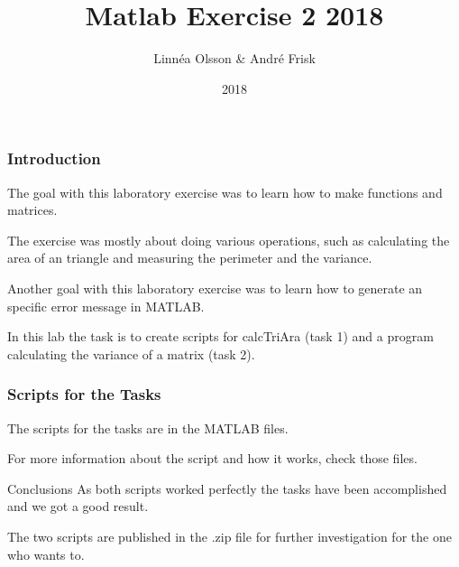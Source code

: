 \documentclass{beamer}
\title{Matlab Exercise 2 2018}
\author{Linnéa Olsson & André Frisk}
\institute{Halmstad University}
\date{2018}
\begin{document}
 
\frame{\titlepage}
 
\begin{frame}
\frametitle{Introduction}
The goal with this laboratory exercise was to learn how to make functions and matrices. 
\newline

The exercise was mostly about doing various operations, such as calculating the area of an triangle and measuring the perimeter and the variance. 
\newline

Another goal with this laboratory exercise was to learn how to generate an specific error message in MATLAB.
\newline

In this lab the task is to create scripts for calcTriAra (task 1) and a program calculating the variance of a matrix (task 2).
\end{frame}
 
 \begin{frame}
\frametitle{Scripts for the Tasks}
The scripts for the tasks are in the MATLAB files. 

\newline
For more information about the script and how it works, check those files.
\end{frame}

 
\begin{frame}{Conclusions}
As both scripts worked perfectly the tasks have been accomplished and we got a good result. 
\newline

The two scripts are published in the .zip file for further investigation for the one who wants to.
    
\end{frame}
 
\end{document}
